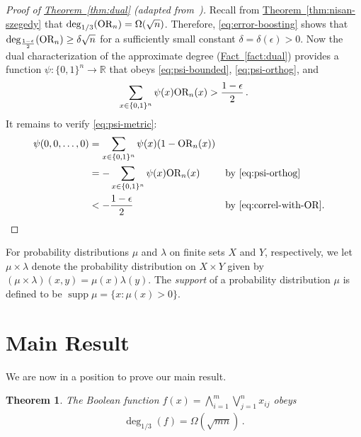 \documentclass[10pt]{article}
\newtheorem{theorem}{Theorem}[section]
\theoremstyle{definition}
\numberwithin{equation}{section}
\newcommand{\R}{{\mathbb R}}
\newcommand{\expref}[2]{\texorpdfstring{\hyperref[#2]{#1~\ref{#2}}}{#1~\ref{#2}}}
\newcommand{\OR}      {\text{\rm OR}}
\newcommand{\adeg}{\deg_{1/3}}
\DeclareMathOperator{\supp}{supp}
\newcommand{\1}{\mathbf{1}}
\newcommand{\zoo}{\{0,1\}}
\newcommand{\zoon}{\zoo^n}
\begin{document}
\begin{proof}[Proof of \expref{Theorem}{thm:dual} 
(adapted from~\cite{GS09npconp})]
Recall from \expref{Theorem}{thm:nisan-szegedy} that $\adeg(\OR_n)=\Omega(\sqrt{n})$.
Therefore, \eqref{eq:error-boosting} shows that 
$\deg_{\frac{1-\epsilon}2}(\OR_n)\geq\delta\sqrt{n}$
for a sufficiently small constant $\delta=\delta(\epsilon)>0$. Now
the dual characterization of the approximate degree (\expref{Fact}{fact:dual})
provides a function $\psi\colon\zoon\to\R$ that obeys \eqref{eq:psi-bounded},
\eqref{eq:psi-orthog}, and
\begin{align}
\sum_{x\in\zoon}\psi(x)\OR_n(x)>\frac{1-\epsilon}2\,.\label{eq:correl-with-OR}
\end{align}
It remains to verify \eqref{eq:psi-metric}:
\begin{align*}
\psi(0,0,\dots,0) & =\sum_{x\in\zoon}\psi(x)(1-\OR_n(x))\\
& =-\sum_{x\in\zoon}\psi(x)\OR_n(x) & & \text{by \eqref{eq:psi-orthog}}\\
& <-\frac{1-\epsilon}2 & & \text{by
\eqref{eq:correl-with-OR}.}\qedhere
\end{align*}
\end{proof}

For probability distributions $\mu$ and $\lambda$ on finite sets
$X$ and $Y$, respectively, we let $\mu\times\lambda$ denote the
probability distribution on $X\times Y$ given by 
$(\mu\times\lambda)(x,y)=\mu(x)\lambda(y)$.
The \emph{support }of a probability distribution $\mu$ is defined
to be $\supp\mu=\{x:\mu(x)>0\}$.
 
 
\section{Main Result}
 
We are now in a position to prove our main result.

%
%
\begin{theorem}
The Boolean function $f(x)=\bigwedge_{i=1}^m\bigvee_{j=1}^nx_{ij}$
obeys
\begin{align}
\adeg(f)=\Omega(\sqrt{mn})\,.\label{eq:f-adeg-main-equation}
\end{align}
%
\end{theorem}
\end{document}
